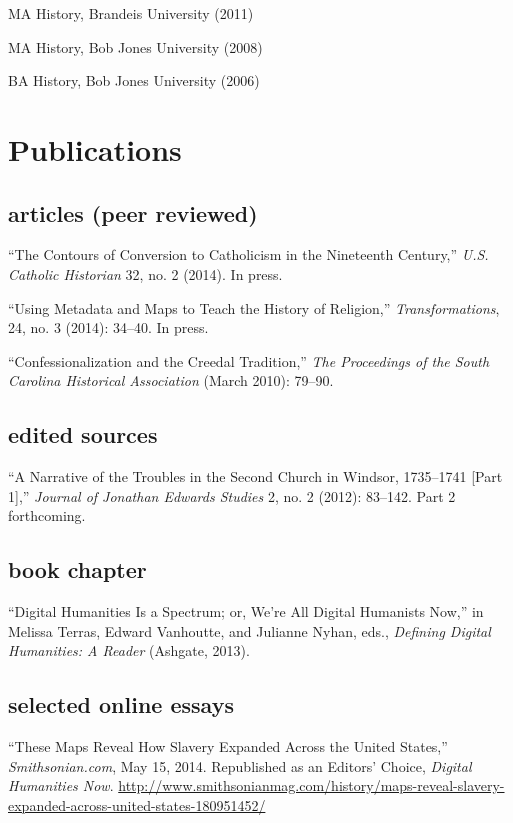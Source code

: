 \documentclass[11pt]{article}
\begin{document}
  MA History, Brandeis University (2011)

  MA History, Bob Jones University (2008)

  BA History, Bob Jones University (2006)

  \section{Publications}

  \subsection{articles (peer reviewed)}

  ``The Contours of Conversion to Catholicism in the Nineteenth Century,'' 
  \emph{U.S.  Catholic Historian} 32, no. 2 (2014). In press.

  ``Using Metadata and Maps to Teach the History of Religion,'' 
  \emph{Transformations}, 24, no. 3 (2014): 34--40. In press.

  ``Confessionalization and the Creedal Tradition,'' \emph{The Proceedings
    of the South Carolina Historical Association} (March 2010): 79--90.

  \subsection{edited sources}

  ``A Narrative of the Troubles in the Second Church in Windsor,
  1735--1741 {[}Part 1{]},'' \emph{Journal of Jonathan Edwards Studies} 2,
  no. 2 (2012): 83--142. Part 2 forthcoming.

  \subsection{book chapter}

  ``Digital Humanities Is a Spectrum; or, We're All Digital Humanists
  Now,'' in Melissa Terras, Edward Vanhoutte, and Julianne Nyhan, eds.,
  \emph{Defining Digital Humanities: A Reader} (Ashgate, 2013).


  \subsection{selected online essays}

  ``These Maps Reveal How Slavery Expanded Across the United States,'' 
  \emph{Smithsonian.com}, May 15, 2014. Republished as an Editors'
  Choice, \emph{Digital Humanities Now}. \url{http://www.smithsonianmag.com/history/maps-reveal-slavery-expanded-across-united-states-180951452/}
\end{document}
